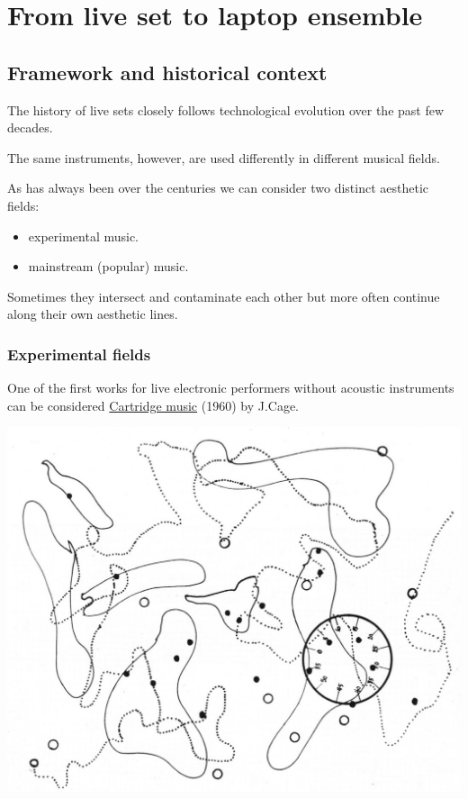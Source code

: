 \chapter{From live set to laptop ensemble}

\section{Framework and historical context}\label{framework-and-historical-context}

The history of live sets closely follows technological evolution over the past few decades.

The same instruments, however, are used differently in different musical fields. 

As has always been over the centuries we can consider two distinct aesthetic fields:

\begin{itemize}
\tightlist
\item experimental music.
\item mainstream (popular) music.
\end{itemize}

Sometimes they intersect and contaminate each other but more often continue along their own aesthetic lines.

\subsection{Experimental fields}\label{experimantal-fields}

One of the first works for live electronic performers without acoustic instruments can be considered \href{http://www.musicaecodice.it/gitmedia/emc/6_lvset/suoni/cartridge.mp3}{Cartridge music} (1960) by J.Cage.

\begin{center}
\includegraphics[scale=0.3]{../img/cartridge.png}
\end{center}

